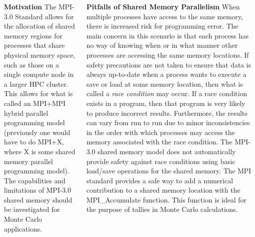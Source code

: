 \documentclass{beamer}
\begin{document}
\begin{frame}[t,fragile]{}
\begin{columns}[t,totalwidth=\textwidth]
\begin{column}{0.3\textwidth}
\begin{block}{\LARGE\textbf{Motivation}}
The MPI-3.0 Standard allows for the allocation of shared memory regions for processes that share
physical memory space, such as those on a single compute node in a larger HPC cluster.
This allows for what is called an MPI+MPI hybrid parallel programming model (previously one would
have to do MPI+X, where X is some shared memory parallel programming model).
The capabilities and limitations of MPI-3.0 shared memory should be investigated for Monte Carlo
applications.
\end{block}

\end{column}

\begin{column}{0.310\textwidth}

\begin{block}{\LARGE\textbf{Pitfalls of Shared Memory Parallelism}}
When multiple processes have access to the same memory,
there is increased risk for programming error.
The main concern in this scenario is that each process has no way of knowing when or in what manner
other processes are accessing the same memory locations.
If safety precautions are not taken to ensure that data is always up-to-date when a process wants
to execute a save or load at some memory location,
then what is called a \textit{race condition} may occur.
If a race condition exists in a program,
then that program is very likely to produce incorrect results.
Furthermore, the results can vary from run to run due to minor inconsistencies in the order with
which processes may access the memory associated with the race condition.
The MPI-3.0 shared memory model does not automatically provide safety against
race conditions using basic load/save operations for the shared memory.
The MPI standard provides a safe way to add a numerical contribution to a shared memory location
with the MPI\_Accumulate function.
This function is ideal for the purpose of tallies in Monte Carlo calculations.
\end{block}


\end{column}
\end{columns}
\end{frame}
\end{document}
